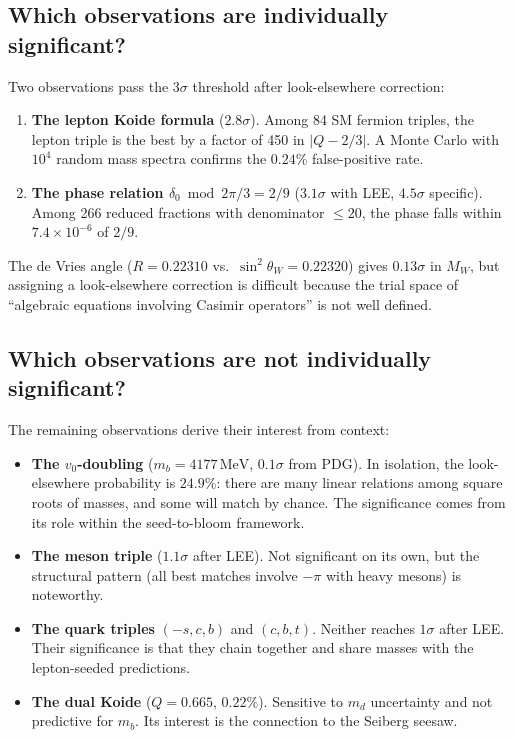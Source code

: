 \documentclass[12pt,a4paper]{article}
\newcommand{\MeV}{\,\text{MeV}}
\begin{document}
\subsection{Which observations are individually significant?}

Two observations pass the $3\sigma$ threshold after look-elsewhere
correction:

\begin{enumerate}
\item \textbf{The lepton Koide formula} ($2.8\sigma$). Among 84 SM
fermion triples, the lepton triple is the best by a factor of 450
in $|Q - 2/3|$. A Monte Carlo with $10^4$ random mass spectra
confirms the $0.24\%$ false-positive rate.

\item \textbf{The phase relation $\delta_0 \bmod 2\pi/3 = 2/9$}
($3.1\sigma$ with LEE, $4.5\sigma$ specific). Among 266 reduced
fractions with denominator $\leq 20$, the phase falls within
$7.4 \times 10^{-6}$ of $2/9$.
\end{enumerate}

The de Vries angle ($R = 0.22310$ vs.\ $\sin^2\theta_W = 0.22320$)
gives $0.13\sigma$ in $M_W$, but assigning a look-elsewhere
correction is difficult because the trial space of ``algebraic
equations involving Casimir operators'' is not well defined.

\subsection{Which observations are not individually significant?}

The remaining observations derive their interest from context:

\begin{itemize}
\item \textbf{The $v_0$-doubling} ($m_b = 4177\MeV$, $0.1\sigma$
from PDG). In isolation, the look-elsewhere probability is $24.9\%$:
there are many linear relations among square roots of masses, and
some will match by chance. The significance comes from its role
within the seed-to-bloom framework.

\item \textbf{The meson triple} ($1.1\sigma$ after LEE). Not
significant on its own, but the structural pattern (all best
matches involve $-\pi$ with heavy mesons) is noteworthy.

\item \textbf{The quark triples} $(-s,c,b)$ and $(c,b,t)$.
Neither reaches $1\sigma$ after LEE. Their significance is that
they chain together and share masses with the lepton-seeded
predictions.

\item \textbf{The dual Koide} ($Q = 0.665$, $0.22\%$). Sensitive
to $m_d$ uncertainty and not predictive for $m_b$. Its interest is
the connection to the Seiberg seesaw.
\end{itemize}
\end{document}
